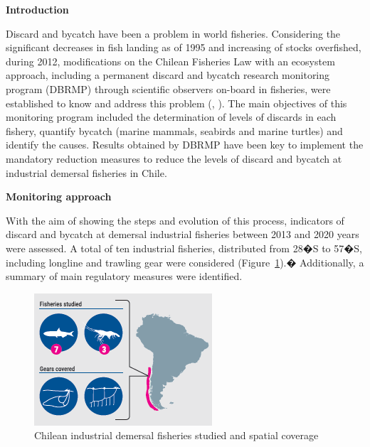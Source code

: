 \documentclass[
  super,
  preprint,
  3p]{elsarticle}
\begin{document}
    \ifdefined\Shaded\renewenvironment{Shaded}{\begin{tcolorbox}[sharp corners, interior hidden, breakable, enhanced, frame hidden, borderline west={3pt}{0pt}{shadecolor}, boxrule=0pt]}{\end{tcolorbox}}\fi

\textbf{Introduction}

Discard and bycatch have been a problem in world fisheries. Considering
the significant decreases in fish landing as of 1995 and increasing of
stocks overfished, during 2012, modifications on the Chilean Fisheries
Law with an ecosystem approach, including a permanent discard and
bycatch research monitoring program (DBRMP) through scientific observers
on-board in fisheries, were established to know and address this problem
(\citep{SanMartin2016}, \citep{Roman2021}). The main objectives of this
monitoring program included the determination of levels of discards in
each fishery, quantify bycatch (marine mammals, seabirds and marine
turtles) and identify the causes. Results obtained by DBRMP have been
key to implement the mandatory reduction measures to reduce the levels
of discard and bycatch at industrial demersal fisheries in Chile.

\textbf{Monitoring approach}

With the aim of showing the steps and evolution of this process,
indicators of discard and bycatch at demersal industrial fisheries
between 2013 and 2020 years were assessed. A total of ten industrial
fisheries, distributed from 28�S to 57�S, including longline and
trawling gear were considered (Figure~\ref{fig-1}).� Additionally, a
summary of main regulatory measures were identified.

\begin{figure}

{\centering \includegraphics{fig1.png}

}

\caption{\label{fig-1}Chilean industrial demersal fisheries studied and
spatial coverage}

\end{figure}
\end{document}
